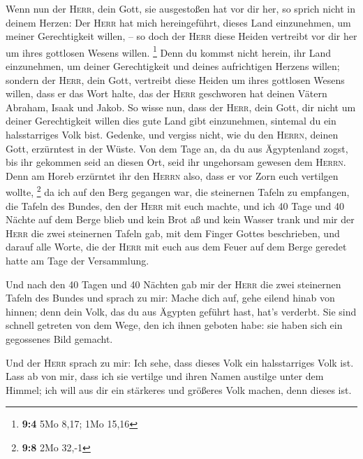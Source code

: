  Wenn nun der \textsc{Herr}, dein Gott, sie ausgestoßen
hat vor dir her, so sprich nicht in deinem Herzen: Der \textsc{Herr} hat
mich hereingeführt, dieses Land einzunehmen, um meiner Gerechtigkeit
willen, -- so doch der \textsc{Herr} diese Heiden vertreibt vor dir her
um ihres gottlosen Wesens willen. \footnote{\textbf{9:4} 5Mo 8,17; 1Mo
  15,16}  Denn du kommst nicht herein, ihr Land
einzunehmen, um deiner Gerechtigkeit und deines aufrichtigen Herzens
willen; sondern der \textsc{Herr}, dein Gott, vertreibt diese Heiden um
ihres gottlosen Wesens willen, dass er das Wort halte, das der
\textsc{Herr} geschworen hat deinen Vätern Abraham, Isaak und Jakob.
 So wisse nun, dass der \textsc{Herr}, dein Gott, dir
nicht um deiner Gerechtigkeit willen dies gute Land gibt einzunehmen,
sintemal du ein halsstarriges Volk bist.  Gedenke, und
vergiss nicht, wie du den \textsc{Herrn}, deinen Gott, erzürntest in der
Wüste. Von dem Tage an, da du aus Ägyptenland zogst, bis ihr gekommen
seid an diesen Ort, seid ihr ungehorsam gewesen dem \textsc{Herrn}.
 Denn am Horeb erzürntet ihr den \textsc{Herrn} also, dass
er vor Zorn euch vertilgen wollte, \footnote{\textbf{9:8} 2Mo 32,-1}
 da ich auf den Berg gegangen war, die steinernen Tafeln
zu empfangen, die Tafeln des Bundes, den der \textsc{Herr} mit euch
machte, und ich 40 Tage und 40 Nächte auf dem Berge blieb und kein Brot
aß und kein Wasser trank  und mir der \textsc{Herr} die
zwei steinernen Tafeln gab, mit dem Finger Gottes beschrieben, und
darauf alle Worte, die der \textsc{Herr} mit euch aus dem Feuer auf dem
Berge geredet hatte am Tage der Versammlung.

 Und nach den 40 Tagen und 40 Nächten gab mir der
\textsc{Herr} die zwei steinernen Tafeln des Bundes  und
sprach zu mir: Mache dich auf, gehe eilend hinab von hinnen; denn dein
Volk, das du aus Ägypten geführt hast, hat's verderbt. Sie sind schnell
getreten von dem Wege, den ich ihnen geboten habe: sie haben sich ein
gegossenes Bild gemacht.

 Und der \textsc{Herr} sprach zu mir: Ich sehe, dass
dieses Volk ein halsstarriges Volk ist.  Lass ab von mir,
dass ich sie vertilge und ihren Namen austilge unter dem Himmel; ich
will aus dir ein stärkeres und größeres Volk machen, denn dieses ist.

